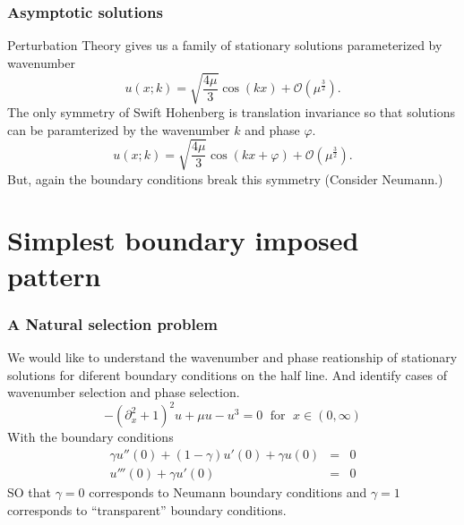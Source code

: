\documentclass{beamer}
\begin{document}
\begin{frame}
\frametitle{Asymptotic solutions}
 Perturbation Theory gives us a family of stationary solutions parameterized by wavenumber
 \[
  u(x;k)=\sqrt{\frac{4\mu}{3}}\cos(kx ) + \mathcal{O}(\mu^{\frac{3}{2}}).
 \]
\pause
The only symmetry of Swift Hohenberg is translation invariance so that solutions can be paramterized by the wavenumber $k$ and phase $\varphi$.
\[
  u(x;k)=\sqrt{\frac{4\mu}{3}}\cos(kx + \varphi) + \mathcal{O}(\mu^{\frac{3}{2}}).
 \]
But, again the boundary conditions break this symmetry (Consider Neumann.)
\end{frame}

\section{Simplest boundary imposed pattern}
\begin{frame}
\frametitle{A Natural selection problem}
 We would like to understand the wavenumber and phase reationship of stationary solutions for diferent boundary conditions on the half line.  
 And identify cases of wavenumber selection and phase selection.
 \[
 -(\partial_x^2 + 1)^2u + \mu u - u^3 = 0  \;\text{  for  }\; x\in (0,\infty)
 \]
 With the boundary conditions
 \begin{eqnarray*}
  \gamma u''(0) + (1-\gamma)u'(0) + \gamma u(0) &=& 0 \\
  u'''(0) + \gamma u'(0) &=& 0
 \end{eqnarray*}
 SO that $\gamma = 0$ corresponds to Neumann boundary conditions and $\gamma = 1$ corresponds to ``transparent'' boundary conditions.

 


 
\end{frame}
\end{document}
